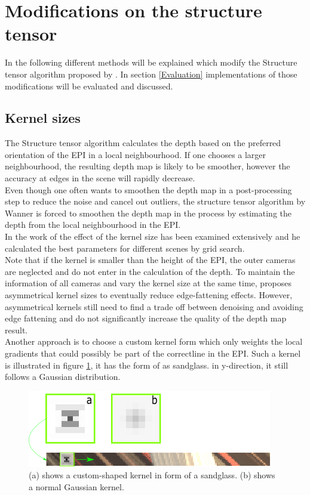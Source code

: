 \documentclass  [
  paper    = a4,
  BCOR     = 10mm,
  twoside,
  fontsize = 12pt,
  fleqn,
  toc      = bibnumbered,
  toc      = listofnumbered,
  numbers  = noendperiod,
  headings = normal,
  listof   = leveldown,
  version  = 3.03
]                                       {scrreprt}
\begin{document}
 \section{Modifications on the structure tensor}
 In the following different methods will be explained which modify the Structure tensor algorithm proposed by \cite{wanner2014orientation}. In section \ref{Evaluation} implementations of those modifications will be evaluated and discussed.
 \subsection{Kernel sizes}
 The Structure tensor algorithm calculates the depth based on the preferred orientation of the EPI in a local neighbourhood. If one chooses a larger neighbourhood, the resulting depth map is likely to be smoother, however the accuracy at edges in the scene will rapidly decrease.\\
 Even though one often wants to smoothen the depth map in a post-processing step to reduce the noise and cancel out outliers, the structure tensor algorithm by Wanner is forced to smoothen the depth map in the process by estimating the depth from the local neighbourhood in the EPI.\\
 In the work of \cite{wanner2014orientation} the effect of the kernel size has been examined extensively and he calculated the best parameters for different scenes by grid search.\\
 Note that if the kernel is smaller than the height of the EPI, the outer cameras are neglected and do not enter in the calculation of the depth. To maintain the information of all cameras and vary the kernel size at the same time, \cite{diebold2016light} proposes asymmetrical kernel sizes to eventually reduce edge-fattening effects. However, asymmetrical kernels still need to find a trade off between denoising and avoiding edge fattening and do not significantly increase the quality of the depth map result.\\
 Another approach is to choose a custom kernel form which only weights the local gradients that could possibly be part of the \glqq correct\grqq line in the EPI. Such a kernel is illustrated in figure \ref{fig:sandclock},  it has the form of as sandglass. in y-direction, it still follows a Gaussian distribution.
 \begin{figure}
 	\centering
 	\includegraphics[width=0.7\linewidth]{images/sandclock.png}
 	\caption[Sandglass Kernel]{(a) shows a custom-shaped kernel in form of a sandglass. (b) shows a normal Gaussian kernel.}
 	\label{fig:sandclock}
 \end{figure}
 
\end{document}
